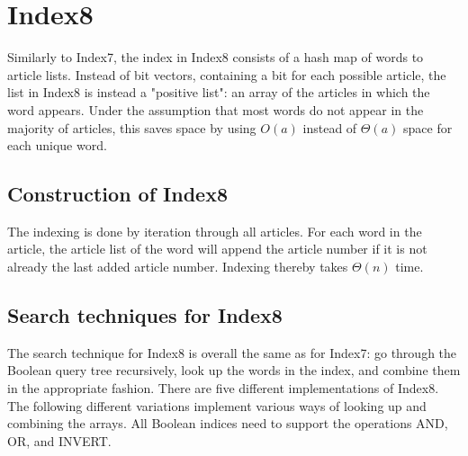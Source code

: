 \section{Index8}
Similarly to Index7, the index in Index8 consists of a hash map of words to article lists. Instead of bit vectors, containing a bit for each possible article, the list in Index8 is instead a "positive list": an array of the articles in which the word appears. Under the assumption that most words do not appear in the majority of articles, this saves space by using $O(a)$ instead of $\Theta(a)$ space for each unique word. 


\subsection{Construction of Index8}
The indexing is done by iteration through all articles. For each word in the article, the article list of the word will append the article number if it is not already the last added article number. Indexing thereby takes $\Theta(n)$ time.

\subsection{Search techniques for Index8}

The search technique for Index8 is overall the same as for Index7: go through the Boolean query tree recursively, look up the words in the index, and combine them in the appropriate fashion. There are five different implementations of Index8. The following different variations implement various ways of looking up and combining the arrays. All Boolean indices need to support the operations AND, OR, and INVERT. 

